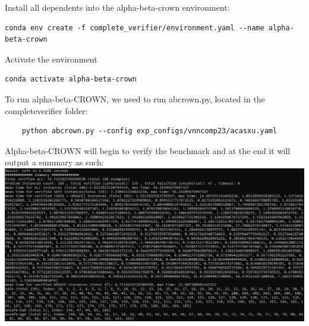 \documentclass{article}
\begin{document}
Install all dependents into the alpha-beta-crown environment:
\begin{verbatim}conda env create -f complete_verifier/environment.yaml --name alpha-beta-crown\end{verbatim}

Activate the environment
\begin{verbatim}conda activate alpha-beta-crown\end{verbatim}
To run alpha-beta-CROWN, we need to run abcrown.py, located in the complete\textunderscore verifier folder:
\begin{verbatim}
    python abcrown.py --config exp_configs/vnncomp23/acasxu.yaml
\end{verbatim}
Alpha-beta-CROWN will begin to verify the benchmark and at the end it will output a summary as such:\newline
\includegraphics[scale=0.6]{alphabeta.jpg}
\end{document}
